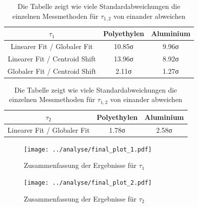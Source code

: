 \documentclass[a4paper,12pt]{article}
\begin{document}
\begin{table}[h]
	\centering
	\begin{tabular}{c |c |c }
	$\tau_{1}$ & Polyethylen & Aluminium \\
	\hline
	Linearer Fit / Globaler Fit   & 10.85σ & 9.96σ \\
	Linearer Fit / Centroid Shift & 13.96σ & 8.92σ  \\
	Globaler Fit / Centroid Shift &  2.11σ & 1.27σ \\
	\end{tabular}

	\vspace*{0.5cm}
	\begin{tabular}{c |c |c }
	$\tau_{2}$ & Polyethylen & Aluminium\\
	\hline
	Linearer Fit / Globaler Fit\hspace*{0.37cm} & 1.78σ & 2.58σ\\
	\end{tabular}
	\caption{Die Tabelle zeigt wie viele Standardabweichungen die einzelnen Messmethoden für $\tau_{1,2}$ von einander abweichen}
	\label{tab:finalsigma}
\end{table} 
\begin{figure}[h]
	\texttt{[image: ../analyse/final\_plot\_1.pdf]}
	\caption{Zusammenfassung der Ergebnisse für $\tau_{1}$ }
	\label{fig:finalt1}
\end{figure}

\begin{figure}[h]
	\texttt{[image: ../analyse/final\_plot\_2.pdf]}
	\caption{Zusammenfassung der Ergebnisse für $\tau_{2}$ }
	\label{fig:finalt2}
\end{figure}
\end{document}
